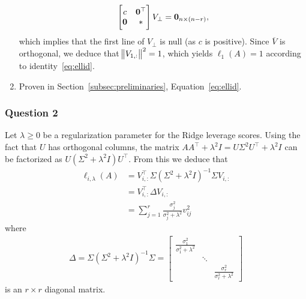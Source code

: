 \documentclass{article}
\begin{document}
\begin{enumerate}[label=\alph*)]
  \begin{align*}
    \begin{bmatrix*}
      c & \zeros^\top\\
      \zeros & *
    \end{bmatrix*} V_\bot = \zeros_{n \times (n - r)},
  \end{align*}
  which implies that the first line of $V_\bot$ is null (as $c$ is positive).
  Since $\overline{V}$ is orthogonal, we deduce that $\norm{V_{1,:}}^2 = 1$,
  which yields $\ell_1(A) = 1$ according to identity~\eqref{eq:ellid}.
\item Proven in Section~\ref{subsec:preliminaries}, Equation~\eqref{eq:ellid}.
\end{enumerate}

\subsubsection{Question 2}\label{subsubsec:q2}

Let $\lambda \geq 0$  be a regularization parameter for the Ridge
leverage scores.
Using the fact that $U$ has orthogonal columns, the matrix $A A^\top +
\lambda^2 I = U \Sigma^2 U^\top + \lambda^2 I$ can be factorized as $U\left(
  \Sigma^2 + \lambda^2 I \right) U^\top$.
From this we deduce that
\begin{align*}
  \ell_{i,\lambda}(A) &= V_{i,:}^\top \Sigma \left( \Sigma^2 + \lambda^2 I \right)^{-1} \Sigma V_{i,:}\\
                      &= V_{i,:}^\top \Delta V_{i,:}\\
                      &= \sum_{j = 1}^r \frac{\sigma_j^2}{\sigma_j^2 + \lambda^2} v_{ij}^2
\end{align*}
where
\begin{align*}
  \Delta = \Sigma \left( \Sigma^2 + \lambda^2 I \right)^{-1} \Sigma =
  \begin{bmatrix}
    \frac{\sigma_1^2}{\sigma_1^2 + \lambda^2} & & \\
    & \ddots & \\
    & & \frac{\sigma_r^2}{\sigma_r^2 + \lambda^2}
  \end{bmatrix}
\end{align*}
is an $r \times r$ diagonal matrix.
\end{document}
